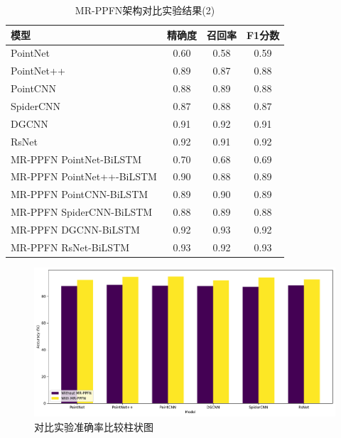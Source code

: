 \begin{table}[htbp]
    \centering
    \caption{MR-PPFN架构对比实验结果(2)}
    \label{tab:MR-PPFN compare res 2}
    \begin{tabular}{lccc}
        \toprule
        \textbf{模型} & \textbf{精确度} & \textbf{召回率} & \textbf{F1分数} \\
        \midrule
        PointNet & 0.60 & 0.58 & 0.59 \\
        PointNet++ & 0.89 & 0.87 & 0.88 \\
        PointCNN & 0.88 & 0.89 & 0.88 \\
        SpiderCNN & 0.87 & 0.88 & 0.87 \\
        DGCNN & 0.91 & 0.92 & 0.91 \\
        RsNet & 0.92 & 0.91 & 0.92 \\
        MR-PPFN PointNet-BiLSTM & 0.70 & 0.68 & 0.69 \\
        MR-PPFN PointNet++-BiLSTM & 0.90 & 0.88 & 0.89 \\
        MR-PPFN PointCNN-BiLSTM & 0.89 & 0.90 & 0.89 \\
        MR-PPFN SpiderCNN-BiLSTM & 0.88 & 0.89 & 0.88 \\
        MR-PPFN DGCNN-BiLSTM & 0.92 & 0.93 & 0.92 \\
        MR-PPFN RsNet-BiLSTM & 0.93 & 0.92 & 0.93 \\
        \bottomrule
    \end{tabular}
\end{table}

\begin{figure}[htbp]
    \centering
    \includegraphics[width=1\linewidth]{imgs/MR-PPFN_accuracy_comparison.pdf}
    \caption{对比实验准确率比较柱状图}
    \label{fig:MR-PPFN_accuracy_comparison}
\end{figure}



